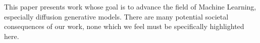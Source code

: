 This paper presents work whose goal is to advance the field of Machine Learning, especially diffusion generative models. There are many potential societal consequences of our work, none which we feel must be specifically highlighted here.